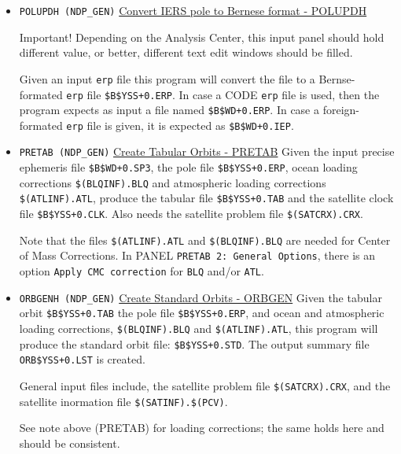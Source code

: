 \begin{itemize}
  
  \item \texttt{POLUPDH (NDP\_GEN)} \underline{Convert IERS pole to Bernese format - POLUPDH}
    \begin{bclogo}[logo=\bcattention, couleurBarre=red, noborder=true, couleur=Peach]{Important!}
      Depending on the Analysis Center, this input panel should hold different
      value, or better, different text edit windows should be filled.
    \end{bclogo}
    Given an input \texttt{erp} file this program will convert the file to a
    Bernse-formated \texttt{erp} file \texttt{\$B\$YSS+0.ERP}. In case a CODE
    \texttt{erp} file is used, then the program expects as input a file named
    \texttt{\$B\$WD+0.ERP}. In case a foreign-formated \texttt{erp} file is
    given, it is expected as \texttt{\$B\$WD+0.IEP}.
  
  \item \texttt{PRETAB (NDP\_GEN)} \underline{Create Tabular Orbits - PRETAB}
    Given the input precise ephemeris file \texttt{\$B\$WD+0.SP3}, the pole file
    \texttt{\$B\$YSS+0.ERP}, ocean loading corrections \texttt{\$(BLQINF).BLQ}
    and atmospheric loading corrections \texttt{\$(ATLINF).ATL}, produce the
    tabular file \texttt{\$B\$YSS+0.TAB} and the satellite clock file 
    \texttt{\$B\$YSS+0.CLK}. Also needs the satellite problem file \texttt{\$(SATCRX).CRX}.


    \textcolor{Cerulean}{Note that the files \texttt{\$(ATLINF).ATL} and 
    \texttt{\$(BLQINF).BLQ} are needed for Center of Mass Corrections. In PANEL
    \texttt{PRETAB 2: General Options}, there is an option 
    \texttt{Apply CMC correction} for \texttt{BLQ} and/or \texttt{ATL}.}

  \item \texttt{ORBGENH (NDP\_GEN)} \underline{Create Standard Orbits - ORBGEN}
    Given the tabular orbit \texttt{\$B\$YSS+0.TAB} the pole file \texttt{\$B\$YSS+0.ERP},
    and ocean and atmospheric loading corrections, \texttt{\$(BLQINF).BLQ} and
    \texttt{\$(ATLINF).ATL}, this program will produce the standard orbit file:
    \texttt{\$B\$YSS+0.STD}. The output summary file \texttt{ORB\$YSS+0.LST} is
    created.

    General input files include, the satellite problem file \texttt{\$(SATCRX).CRX},
    and the satellite inormation file \texttt{\$(SATINF).\$(PCV)}.

    See note above (PRETAB) for loading corrections; the same holds here and should
    be consistent.
\end{itemize}

